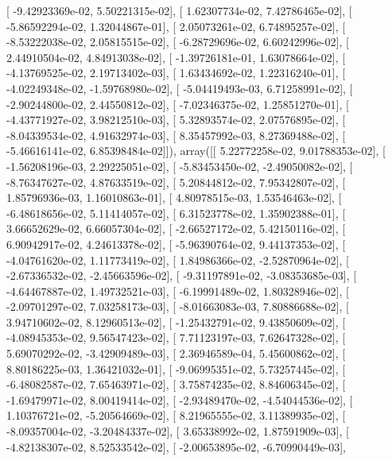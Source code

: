\documentclass{article}
\begin{document}
       [ -9.42923369e-02,   5.50221315e-02],
       [  1.62307734e-02,   7.42786465e-02],
       [ -5.86592294e-02,   1.32044867e-01],
       [  2.05073261e-02,   6.74895257e-02],
       [ -8.53222038e-02,   2.05815515e-02],
       [ -6.28729696e-02,   6.60242996e-02],
       [  2.44910504e-02,   4.84913038e-02],
       [ -1.39726181e-01,   1.63078664e-02],
       [ -4.13769525e-02,   2.19713402e-03],
       [  1.63434692e-02,   1.22316240e-01],
       [ -4.02249348e-02,  -1.59768980e-02],
       [ -5.04419493e-03,   6.71258991e-02],
       [ -2.90244800e-02,   2.44550812e-02],
       [ -7.02346375e-02,   1.25851270e-01],
       [ -4.43771927e-02,   3.98212510e-03],
       [  5.32893574e-02,   2.07576895e-02],
       [ -8.04339534e-02,   4.91632974e-03],
       [  8.35457992e-03,   8.27369488e-02],
       [ -5.46616141e-02,   6.85398484e-02]]), array([[  5.22772258e-02,   9.01788353e-02],
       [ -1.56208196e-03,   2.29225051e-02],
       [ -5.83453450e-02,  -2.49050082e-02],
       [ -8.76347627e-02,   4.87633519e-02],
       [  5.20844812e-02,   7.95342807e-02],
       [  1.85796936e-03,   1.16010863e-01],
       [  4.80978515e-03,   1.53546463e-02],
       [ -6.48618656e-02,   5.11414057e-02],
       [  6.31523778e-02,   1.35902388e-01],
       [  3.66652629e-02,   6.66057304e-02],
       [ -2.66527172e-02,   5.42150116e-02],
       [  6.90942917e-02,   4.24613378e-02],
       [ -5.96390764e-02,   9.44137353e-02],
       [ -4.04761620e-02,   1.11773419e-02],
       [  1.84986366e-02,  -2.52870964e-02],
       [ -2.67336532e-02,  -2.45663596e-02],
       [ -9.31197891e-02,  -3.08353685e-03],
       [ -4.64467887e-02,   1.49732521e-03],
       [ -6.19991489e-02,   1.80328946e-02],
       [ -2.09701297e-02,   7.03258173e-03],
       [ -8.01663083e-03,   7.80886688e-02],
       [  3.94710602e-02,   8.12960513e-02],
       [ -1.25432791e-02,   9.43850609e-02],
       [ -4.08945353e-02,   9.56547423e-02],
       [  7.71123197e-03,   7.62647328e-02],
       [  5.69070292e-02,  -3.42909489e-03],
       [  2.36946589e-04,   5.45600862e-02],
       [  8.80186225e-03,   1.36421032e-01],
       [ -9.06995351e-02,   5.73257445e-02],
       [ -6.48082587e-02,   7.65463971e-02],
       [  3.75874235e-02,   8.84606345e-02],
       [ -1.69479971e-02,   8.00419414e-02],
       [ -2.93489470e-02,  -4.54044536e-02],
       [  1.10376721e-02,  -5.20564669e-02],
       [  8.21965555e-02,   3.11389935e-02],
       [ -8.09357004e-02,  -3.20484337e-02],
       [  3.65338992e-02,   1.87591909e-03],
       [ -4.82138307e-02,   8.52533542e-02],
       [ -2.00653895e-02,  -6.70990449e-03],
\end{document}
